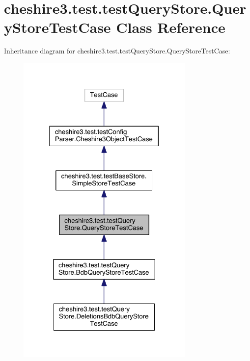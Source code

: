 \hypertarget{classcheshire3_1_1test_1_1test_query_store_1_1_query_store_test_case}{\section{cheshire3.\-test.\-test\-Query\-Store.\-Query\-Store\-Test\-Case Class Reference}
\label{classcheshire3_1_1test_1_1test_query_store_1_1_query_store_test_case}
}


Inheritance diagram for cheshire3.\-test.\-test\-Query\-Store.\-Query\-Store\-Test\-Case\-:
\nopagebreak
\begin{figure}[H]
\begin{center}
\leavevmode
\includegraphics[width=246pt]{classcheshire3_1_1test_1_1test_query_store_1_1_query_store_test_case__inherit__graph}
\end{center}
\end{figure}


